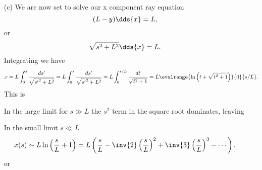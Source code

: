 {\begin{enumerate}
In the large limit for \(s \gg L\) the \(s^2\) term dominates, leaving


A plot of \(y/L\), \(-s/L\), and \(-s^2/2 L^2\) can be found in \cref{fig:modernOpticsProblemSet1:modernOpticsProblemSet1Fig2b} and \cref{fig:modernOpticsProblemSet1:modernOpticsProblemSet1Fig2bBig}.
%
%
\item[(c)]
We are now set to solve our x component ray equation
%
\begin{dmath}\label{eqn:modernOpticsProblemSet1P2:290}
(L - y) \dds{x} = L,
\end{dmath}
%
or
\begin{dmath}\label{eqn:modernOpticsProblemSet1P2:310}
\sqrt{s^2 + L^2} \dds{x} = L.
\end{dmath}
%
Integrating we have
%
\begin{dmath}\label{eqn:modernOpticsProblemSet1P2:330}
x
= L \int_0^s \frac{ds'}{\sqrt{{s'}^2 + L^2}}
= L \int_0^s \frac{ds'}{\sqrt{{s'}^2 + L^2}}
= L \int_0^{s/L} \frac{dt}{\sqrt{t^2 + 1}}
= L \evalrange{ \ln\left( t + \sqrt{ t^2 + 1} \right) }{0}{s/L}.
\end{dmath}
%
This is


In the large limit for \(s \gg L\) the \(s^2\) term in the square root dominates, leaving


In the small limit \(s \ll L\)
%
\begin{dmath}\label{eqn:modernOpticsProblemSet1P2:390}
x(s) \sim L \ln\left( \frac{s}{L} + 1 \right)
= L \left(
\frac{s}{L}
 -\inv{2}
\left(
\frac{s}{L}
\right)^2
 +\inv{3}
\left(
\frac{s}{L}
\right)^3
- \cdots
\right),
\end{dmath}
%
or


\end{enumerate}}
